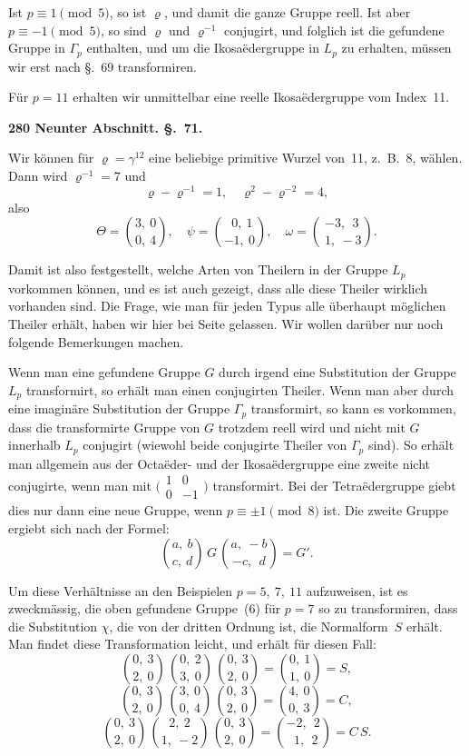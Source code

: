 \documentclass[12pt,a4paper]{article}
\begin{document}
Ist $p \equiv 1 \pmod 5$, so ist $\varrho$, und damit die ganze Gruppe reell. Ist aber $p \equiv -1 \pmod 5$, so sind $\varrho$ und $\varrho^{-1}$ conjugirt, und folglich ist die gefundene Gruppe in $\varGamma_p$ enthalten, und um die Ikosa\"edergruppe in $L_p$ zu erhalten, m\"ussen wir erst nach \S.~69 transformiren.

F\"ur $p=11$ erhalten wir unmittelbar eine reelle Ikosa\"edergruppe vom Index~11.

\bigskip
\noindent\textbf{280 Neunter Abschnitt. \S.~71.}

Wir k\"onnen f\"ur $\varrho = \gamma^{12}$ eine beliebige primitive Wurzel von~11, z.~B.~8, w\"ahlen. Dann wird $\varrho^{-1}=7$ und
\[
\varrho - \varrho^{-1} = 1,\quad \varrho^2 - \varrho^{-2} = 4,
\]
also
\[
\Theta = \binom{3,\ 0}{0,\ 4},\quad \psi = \binom{\ \ 0,\ 1}{-1,\ 0},\quad \omega = \binom{-3,\ \ 3}{\ 1,\ -3}.
\]

Damit ist also festgestellt, welche Arten von Theilern in der Gruppe $L_p$ vorkommen k\"onnen, und es ist auch gezeigt, dass alle diese Theiler wirklich vorhanden sind. Die Frage, wie man f\"ur jeden Typus alle \"uberhaupt m\"oglichen Theiler erh\"alt, haben wir hier bei Seite gelassen. Wir wollen dar\"uber nur noch folgende Bemerkungen machen.

Wenn man eine gefundene Gruppe $G$ durch irgend eine Substitution der Gruppe $L_p$ transformirt, so erh\"alt man einen conjugirten Theiler. Wenn man aber durch eine imagin\"are Substitution der Gruppe $\varGamma_p$ transformirt, so kann es vorkommen, dass die transformirte Gruppe von $G$ trotzdem reell wird und nicht mit $G$ innerhalb $L_p$ conjugirt (wiewohl beide conjugirte Theiler von $\varGamma_p$ sind). So erh\"alt man allgemein aus der Octa\"eder- und der Ikosa\"edergruppe eine zweite nicht conjugirte, wenn man mit $\bigl(\begin{smallmatrix} 1&0\\0&-1\end{smallmatrix}\bigr)$ transformirt. Bei der Tetra\"edergruppe giebt dies nur dann eine neue Gruppe, wenn $p \equiv \pm 1 \pmod 8$ ist. Die zweite Gruppe ergiebt sich nach der Formel:
\[
\binom{a,\ b}{c,\ d}\, G\, \binom{a,\ -b}{-c,\ \ d} = G'.
\]

Um diese Verh\"altnisse an den Beispielen $p=5,\ 7,\ 11$ aufzuweisen, ist es zweckm\"assig, die oben gefundene Gruppe~(6) f\"ur $p=7$ so zu transformiren, dass die Substitution $\chi$, die von der dritten Ordnung ist, die Normalform~$S$ erh\"alt. Man findet diese Transformation leicht, und erh\"alt f\"ur diesen Fall:
\[
\binom{0,\ 3}{2,\ 0}\, \binom{0,\ 2}{3,\ 0}\, \binom{0,\ 3}{2,\ 0} = \binom{0,\ 1}{1,\ 0} = S,
\]
\[
\binom{0,\ 3}{2,\ 0}\, \binom{3,\ 0}{0,\ 4}\, \binom{0,\ 3}{2,\ 0} = \binom{4,\ 0}{0,\ 3} = C,
\]
\[
\binom{0,\ 3}{2,\ 0}\, \binom{2,\ 2}{1,\ -2}\, \binom{0,\ 3}{2,\ 0} = \binom{-2,\ \ 2}{\ \ 1,\ \ 2} = C\,S.
\]
\end{document}
